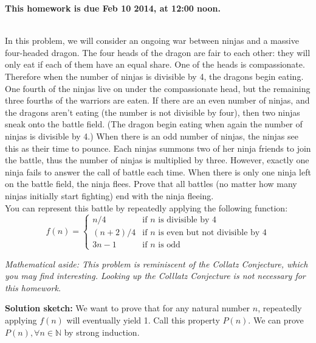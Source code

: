 \documentclass[11pt]{article}
\newif\ifsolutions
\newcommand{\sketch}{\textbf{Solution sketch:}}
\begin{document}
\maketitle

\vspace{0.5em}
{\Large{\textbf{This homework is due Feb 10 2014, at 12:00 noon.}}}


\begin{qunlist}

 \\ 
In this problem, we will consider an ongoing war between ninjas and a massive four-headed dragon. 
The four heads of the dragon are fair to each other: 
they will only eat if each of them have an equal share. One of the heads is compassionate. 
Therefore when the number of ninjas is divisible by 4, the dragons begin eating.  
One fourth of the ninjas live on under the compassionate head, 
but the remaining three fourths of the warriors are eaten. 
If there are an even number of ninjas, and the dragons aren't eating 
(the number is not divisible by four), then two ninjas sneak onto the battle field. 
(The dragon begin eating when again the number of ninjas is divisible by 4.)
When there is an odd number of ninjas, the ninjas see this as their time to pounce. 
Each ninjas summons two of her ninja friends to join the battle, 
thus the number of ninjas is multiplied by three. 
However, exactly one ninja fails to answer the call of battle each time. 
When there is only one ninja left on the battle field, the ninja flees. 
Prove that all battles (no matter how many ninjas initially start fighting) 
end with the ninja fleeing. \\
You can represent this battle by repeatedly applying the following function:
\[ f(n) = \left\{ 
    \begin{array}{cl} 
        n/4 & \text{if $n$ is divisible by 4} \\
        (n+2)/4 & \text{if $n$ is even but not divisible by 4} \\
        3n - 1 & \text{if $n$ is odd} 
    \end{array} 
\right. \]

\textit{Mathematical aside: This problem is reminiscent of the Collatz Conjecture, which you may find interesting. Looking up the Colllatz Conjecture is not necessary for this homework.}

\ifsolutions
\sketch
We want to prove that for any natural number $n$, repeatedly applying $f(n)$ will eventually yield 1. Call this property $P(n)$. We can prove $P(n), \forall n \in \mathbb{N}$ by strong induction.


\end{qunlist}
\end{document}
